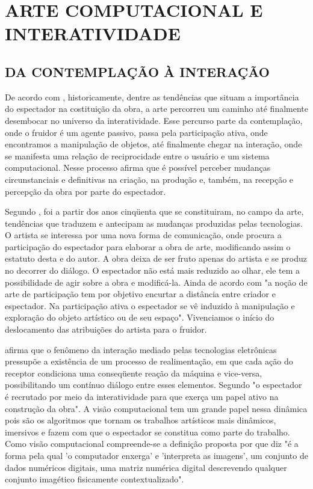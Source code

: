 \chapter{ARTE COMPUTACIONAL E INTERATIVIDADE}

\section{DA CONTEMPLAÇÃO À INTERAÇÃO}

De acordo com , historicamente, dentre as tendências que situam a importância do espectador na costituição da obra, a arte percorreu um caminho até finalmente desembocar no universo da interatividade. Esse percurso parte da contemplação, onde o fruidor é um agente passivo, passa pela participação ativa, onde encontramos a manipulação de objetos, até finalmente chegar na interação, onde se manifesta uma relação de reciprocidade entre o usuário e um sistema computacional. Nesse processo  afirma que é possível perceber mudanças circunstanciais e definitivas na criação, na produção e, também, na recepção e percepção da obra por parte do espectador. 

Segundo , foi a partir dos anos cinqüenta que se constituiram, no campo da arte, tendências que traduzem e antecipam as mudanças produzidas pelas tecnologias. O artista se interessa por uma nova forma de comunicação, onde procura a participação do espectador para elaborar a obra de arte, modificando assim o estatuto desta e do autor. A obra deixa de ser fruto apenas do artista e se produz no decorrer do diálogo. O espectador não está mais reduzido ao olhar, ele tem a possibilidade de agir sobre a obra e modificá-la. Ainda de acordo com  "a noção de arte de participação tem por objetivo encurtar a distância entre criador e espectador. Na participação ativa o espectador se vê induzido à manipulação e exploração do objeto artístico ou de seu espaço". Vivenciamos o início do deslocamento das atribuições do artista para o fruidor. 

 afirma que o fenômeno da interação mediado pelas tecnologias eletrônicas pressupõe a existência de um processo de realimentação, em que cada ação do receptor condiciona uma conseqüente reação da máquina e vice-versa, possibilitando um contínuo diálogo entre esses elementos. Segundo  "o espectador é recrutado por meio da interatividade para que exerça um papel ativo na construção da obra". A visão computacional tem um grande papel nessa dinâmica pois são os algoritmos que tornam os trabalhos artísticos mais dinâmicos, imersivos e fazem com que o espectador se constitua como parte do trabalho. Como visão computacional compreende-se a definição proposta por  que diz "é a forma pela qual 'o computador enxerga' e 'interpreta as imagens', um conjunto de dados numéricos digitais, uma matriz numérica digital descrevendo qualquer conjunto imagético fisicamente contextualizado".

